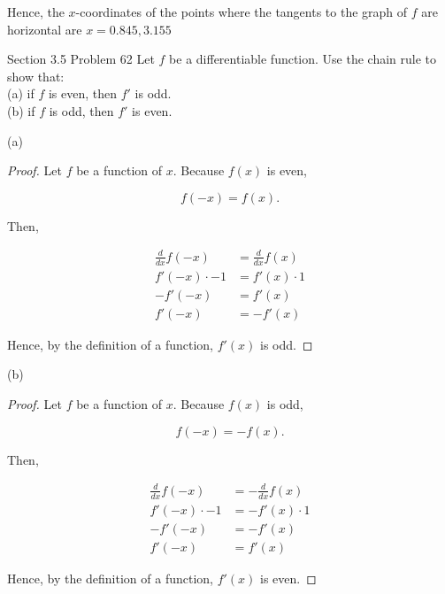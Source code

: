 \documentclass{article}
\begin{document}
    Hence, the $x$-coordinates of the points where the tangents to the graph of $f$ are horizontal are $x=0.845,3.155$

    \pagebreak
    \thispagestyle{page8}

    \begin{tbhtheorem}{Section 3.5 Problem 62}
        Let $f$ be a differentiable function. Use the chain rule to show that: \\
        (a) if $f$ is even, then $f'$ is odd. \\
        (b) if $f$ is odd, then $f'$ is even.
    \end{tbhtheorem}

    (a)

    \begin{proof}
        Let $f$ be a function of $x$. Because $f(x)$ is even,

        \[
            f(-x) = f(x).
        \]

        Then,

        \begin{align*}
            \frac{d}{dx} f(-x)  &= \frac{d}{dx} f(x) \\
            f'(-x) \cdot -1     &= f'(x) \cdot 1 \\
            -f'(-x)             &= f'(x) \\
            f'(-x)              &= -f'(x)
        \end{align*}

        Hence, by the definition of a function, $f'(x)$ is odd.
    \end{proof}

    (b)



    \begin{proof}
        Let $f$ be a function of $x$. Because $f(x)$ is odd,

        \[
            f(-x) = -f(x).
        \]

        Then,

        \begin{align*}
            \frac{d}{dx} f(-x)  &= -\frac{d}{dx} f(x) \\
            f'(-x) \cdot -1     &= -f'(x) \cdot 1 \\
            -f'(-x)             &= -f'(x) \\
            f'(-x)              &= f'(x)
        \end{align*}

        Hence, by the definition of a function, $f'(x)$ is even.
    \end{proof}
\end{document}
